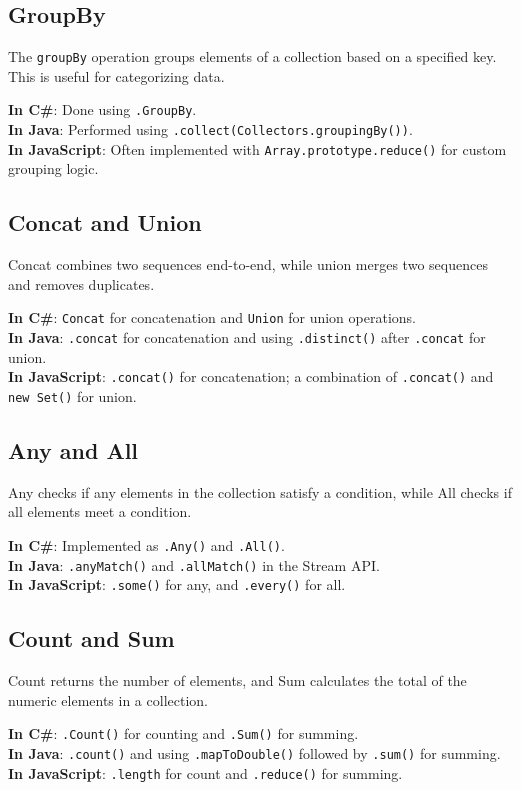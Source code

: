\subsection*{GroupBy}
The \texttt{groupBy} operation groups elements of a collection based on a specified key. This is useful for categorizing data.

\textbf{In C\#}: Done using \texttt{.GroupBy}. \\
\textbf{In Java}: Performed using \texttt{.collect(Collectors.groupingBy())}. \\
\textbf{In JavaScript}: Often implemented with \texttt{Array.prototype.reduce()} for custom grouping logic.

\subsection*{Concat and Union}
Concat combines two sequences end-to-end, while union merges two sequences and removes duplicates.

\textbf{In C\#}: \texttt{Concat} for concatenation and \texttt{Union} for union operations. \\
\textbf{In Java}: \texttt{.concat} for concatenation and using \texttt{.distinct()} after \texttt{.concat} for union. \\
\textbf{In JavaScript}: \texttt{.concat()} for concatenation; a combination of \texttt{.concat()} and \texttt{new Set()} for union.

\subsection*{Any and All}
Any checks if any elements in the collection satisfy a condition, while All checks if all elements meet a condition.

\textbf{In C\#}: Implemented as \texttt{.Any()} and \texttt{.All()}. \\
\textbf{In Java}: \texttt{.anyMatch()} and \texttt{.allMatch()} in the Stream API. \\
\textbf{In JavaScript}: \texttt{.some()} for any, and \texttt{.every()} for all.

\subsection*{Count and Sum}
Count returns the number of elements, and Sum calculates the total of the numeric elements in a collection.

\textbf{In C\#}: \texttt{.Count()} for counting and \texttt{.Sum()} for summing. \\
\textbf{In Java}: \texttt{.count()} and using \texttt{.mapToDouble()} followed by \texttt{.sum()} for summing. \\
\textbf{In JavaScript}: \texttt{.length} for count and \texttt{.reduce()} for summing.

